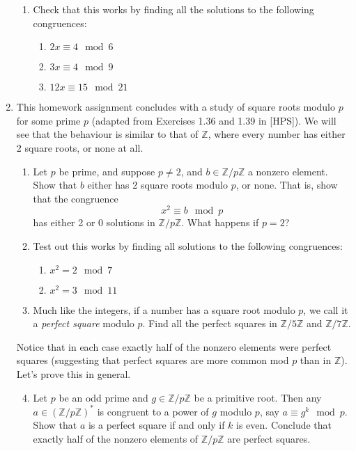\documentclass[11pt]{article}
\newcommand{\bZ}{\mathbb{Z}}
\begin{document}
\begin{enumerate}
{\begin{enumerate}
{    }
    \item{
    Check that this works by finding all the solutions to the following congruences:
    \begin{enumerate}
      \item{$2x\equiv 4\mod 6$}
      \item{$3x\equiv 4\mod 9$}
      \item{$12x\equiv15\mod 21$}
    \end{enumerate}
    }
  \end{enumerate}
  }
  \item{
  This homework assignment concludes with a study of square roots modulo $p$ for some prime $p$ (adapted from Exercises 1.36 and 1.39 in [HPS]).  We will see that the behaviour is similar to that of $\bZ$, where every number has either 2 square roots, or none at all.
  \begin{enumerate}
    \item{
    Let $p$ be prime, and suppose $p\not=2$, and $b\in\bZ/p\bZ$ a nonzero element.  Show that $b$ either has 2 square roots modulo $p$, or none.  That is, show that the congruence
    \[x^2\equiv b\mod p\]
    has either 2 or 0 solutions in $\bZ/p\bZ$.  What happens if $p=2$?
    }
    \item{
    Test out this works by finding all solutions to the following congruences:
    \begin{enumerate}
      \item{$x^2 = 2\mod7$}
      \item{$x^2 = 3\mod11$}
    \end{enumerate}
    }
    \item{
    Much like the integers, if a number has a square root modulo $p$, we call it a \textit{perfect square} modulo $p$.  Find all the perfect squares in $\bZ/5\bZ$ and $\bZ/7\bZ$.
    }
  \end{enumerate}
  Notice that in each case exactly half of the nonzero elements were perfect squares (suggesting that perfect squares are more common mod $p$ than in $\bZ$).  Let's prove this in general.
  \begin{enumerate}
    \setcounter{enumii}{3}
    \item{
    Let $p$ be an odd prime and $g\in\bZ/p\bZ$ be a primitive root.  Then any $a\in(\bZ/p\bZ)^*$ is congruent to a power of $g$ modulo $p$, say $a\equiv g^k\mod p$.  Show that $a$ is a perfect square if and only if $k$ is even.  Conclude that exactly half of the nonzero elements of $\bZ/p\bZ$ are perfect squares.
    }
  \end{enumerate}
}
\end{enumerate}
\end{document}
